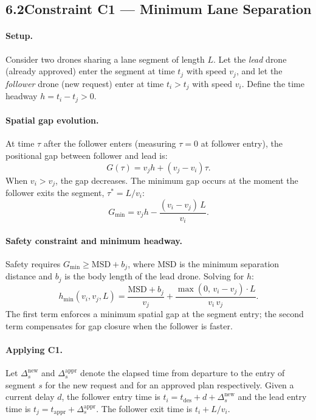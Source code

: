 \documentclass[12pt,a4paper]{article}
\newcommand{\MSD}{\mathrm{MSD}}
\newcommand{\hmin}{h_{\min}}
\begin{document}
\bigskip
\subsection*{6.2\quad Constraint C1 — Minimum Lane Separation}

\paragraph{Setup.}
Consider two drones sharing a lane segment of length $L$.  Let the
\emph{lead} drone (already approved) enter the segment at time $t_j$ with
speed $v_j$, and let the \emph{follower} drone (new request) enter at time
$t_i > t_j$ with speed $v_i$.  Define the time headway
$h = t_i - t_j > 0$.

\paragraph{Spatial gap evolution.}
At time $\tau$ after the follower enters (measuring $\tau = 0$ at follower
entry), the positional gap between follower and lead is:
\begin{equation}
  G(\tau) = v_j h + (v_j - v_i)\tau.
  \label{eq:gap}
\end{equation}
When $v_i > v_j$, the gap decreases.  The minimum gap occurs at the moment
the follower exits the segment, $\tau^* = L / v_i$:
\begin{equation}
  G_{\min} = v_j h - \frac{(v_i - v_j)\,L}{v_i}.
  \label{eq:gmin}
\end{equation}

\paragraph{Safety constraint and minimum headway.}
Safety requires $G_{\min} \ge \MSD + b_j$, where $\MSD$ is the minimum
separation distance and $b_j$ is the body length of the lead drone.
Solving for $h$:
\begin{equation}
  \boxed{
  \hmin(v_i, v_j, L) =
    \frac{\MSD + b_j}{v_j}
    + \frac{\max(0,\, v_i - v_j)\cdot L}{v_i\, v_j}.
  }
  \label{eq:hmin}
\end{equation}
The first term enforces a minimum spatial gap at the segment entry; the second
term compensates for gap closure when the follower is faster.

\paragraph{Applying C1.}
Let $\Delta_s^{\mathrm{new}}$ and $\Delta_s^{\mathrm{appr}}$ denote the elapsed
time from departure to the entry of segment $s$ for the new request and for an
approved plan respectively.  Given a current delay $d$, the follower entry
time is $t_i = t_{\mathrm{des}} + d + \Delta_s^{\mathrm{new}}$ and the lead
entry time is $t_j = t_{\mathrm{appr}} + \Delta_s^{\mathrm{appr}}$.
The follower exit time is $t_i + L/v_i$.
\end{document}
